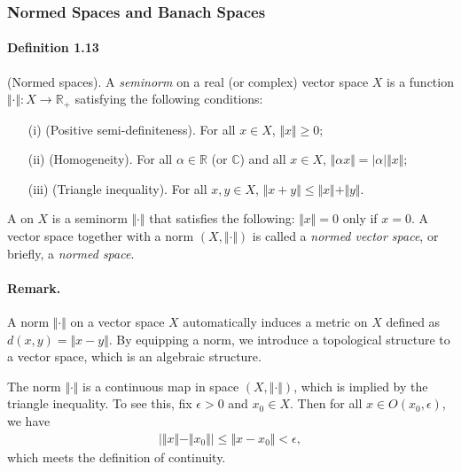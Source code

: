 \documentclass{article}
\begin{document}
\subsubsection{Normed Spaces and Banach Spaces}
\paragraph{Definition 1.13\label{def:1.13}} (Normed spaces). A \textit{seminorm} on a real (or complex) vector space $X$ is a function $\Vert\cdot\Vert:X\to\mathbb{R}_+$ satisfying the following conditions:
\begin{itemize}
	\item[(i)] (Positive semi-definiteness). For all $x\in X$, $\Vert x\Vert\geq 0$; 
	\item[(ii)] (Homogeneity). For all $\alpha\in\mathbb{R}$ (or $\mathbb{C}$) and all $x\in X$, $\Vert\alpha x\Vert = \vert\alpha\vert\Vert x\Vert$; 
	\item[(iii)] (Triangle inequality). For all $x,y\in X$, $\Vert x+y\Vert\leq \Vert x\Vert + \Vert y\Vert$.
\end{itemize}
A  on $X$ is a seminorm $\Vert\cdot\Vert$ that satisfies the following: $\Vert x\Vert=0$ only if $x=0$. A vector space together with a norm $(X,\Vert\cdot\Vert)$ is called a \textit{normed vector space}, or briefly, a \textit{normed space}.

\paragraph{Remark.} A norm $\Vert\cdot\Vert$ on a vector space $X$ automatically induces a metric on $X$ defined as $d(x,y)=\Vert x-y\Vert$. By equipping a norm, we introduce a topological structure to a vector space, which is an algebraic structure.

The norm $\Vert\cdot\Vert$ is a continuous map in space $(X,\Vert\cdot\Vert)$, which is implied by the triangle inequality. To see this, fix $\epsilon > 0$ and $x_0\in X$. Then for all $x\in O(x_0,\epsilon)$, we have
\begin{align*}
	\left\vert\Vert x\Vert - \Vert x_0\Vert\right\vert \leq \Vert x-x_0\Vert < \epsilon,
\end{align*}
which meets the definition of continuity.
\end{document}
